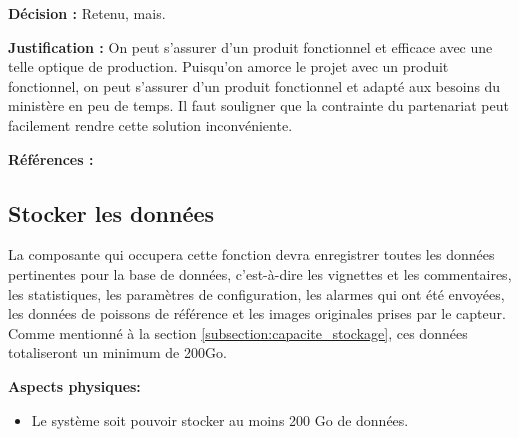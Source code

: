 \textbf{Décision :} Retenu, mais.

\textbf{Justification :} On peut s’assurer d’un produit fonctionnel et efficace avec une telle optique de production. Puisqu’on amorce le projet avec un produit fonctionnel, on peut s’assurer d’un produit fonctionnel et adapté aux besoins du ministère en peu de temps. Il faut souligner que la contrainte du partenariat peut facilement rendre cette solution inconvéniente.


\textbf{Références :} \cite{fishverify}




\begin{table}[!htb]
\footnotesize
\centering
{}
\caption{Faisabilité des concepts pour identifier les poissons et compiler les données}
\label{t:Decision_identifier}
\end{table}


\subsection{Stocker les données}
La composante qui occupera cette fonction devra enregistrer toutes les données pertinentes pour la base de données, c'est-à-dire les vignettes et les commentaires, les statistiques, les paramètres de configuration, les alarmes  qui ont été envoyées, les données de poissons de référence et les images originales prises par le capteur.
Comme mentionné à la section \ref{subsection:capacite_stockage}, ces données totaliseront un minimum de 200Go.

\textbf{Aspects physiques:}
\begin{itemize} [label = {--}]
    \item Le système soit pouvoir stocker au moins 200 Go de données.
\end{itemize}

